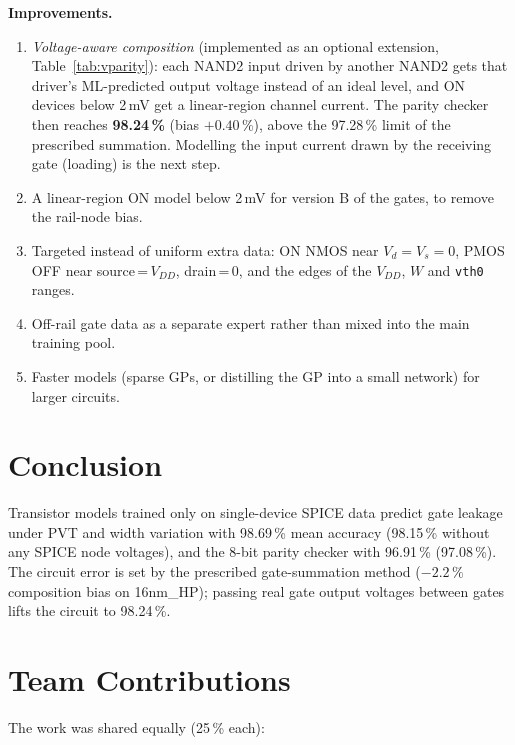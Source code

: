 ﻿\documentclass[conference,10pt]{IEEEtran}
\newcommand{\cc}[1]{\texttt{#1}}
\newcommand{\pct}{\,\%}
\begin{document}
\textbf{Improvements.}
\begin{enumerate}
\item \emph{Voltage-aware composition} (implemented as an optional extension, Table~\ref{tab:vparity}):
each NAND2 input driven by another NAND2 gets that driver's ML-predicted output voltage instead of
an ideal level, and ON devices below 2\,mV get a linear-region channel current. The parity checker
then reaches \textbf{98.24\pct} (bias $+0.40\pct$), above the 97.28\pct{} limit of the prescribed
summation. Modelling the input current drawn by the receiving gate (loading) is the next step.
\item A linear-region ON model below 2\,mV for version B of the gates, to remove the rail-node
bias.
\item Targeted instead of uniform extra data: ON NMOS near $V_d=V_s=0$, PMOS OFF near
source\,=\,$V_{DD}$, drain\,=\,0, and the edges of the $V_{DD}$, $W$ and \cc{vth0} ranges.
\item Off-rail gate data as a separate expert rather than mixed into the main training pool.
\item Faster models (sparse GPs, or distilling the GP into a small network) for larger circuits.
\end{enumerate}

\FloatBarrier
\section{Conclusion}
Transistor models trained only on single-device SPICE data predict gate leakage under PVT and
width variation with 98.69\pct{} mean accuracy (98.15\pct{} without any SPICE node voltages), and
the 8-bit parity checker with 96.91\pct{} (97.08\pct). The circuit error is set by the prescribed
gate-summation method ($-2.2\pct$ composition bias on 16nm\_HP); passing real gate output voltages
between gates lifts the circuit to 98.24\pct.

\newpage
\section*{Team Contributions}
The work was shared equally (25\pct{} each):
\end{document}
